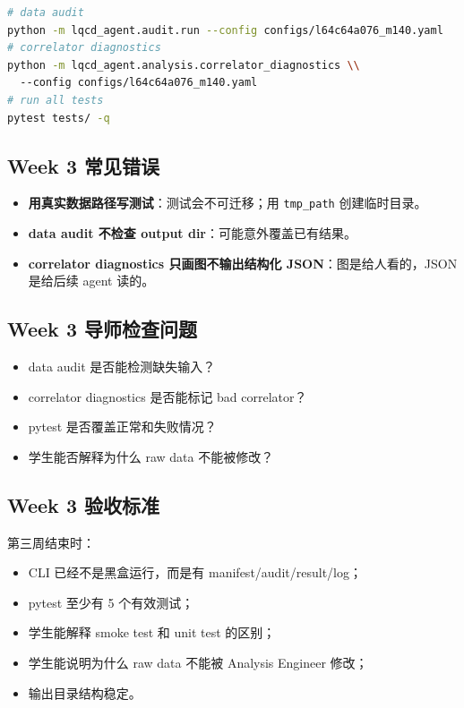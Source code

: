 \documentclass[11pt,a4paper,fontset=fandol]{ctexart}
\begin{document}
\begin{lstlisting}[language=bash]
# data audit
python -m lqcd_agent.audit.run --config configs/l64c64a076_m140.yaml
# correlator diagnostics
python -m lqcd_agent.analysis.correlator_diagnostics \\
  --config configs/l64c64a076_m140.yaml
# run all tests
pytest tests/ -q
\end{lstlisting}

\subsection{Week 3 常见错误}
\begin{itemize}[leftmargin=2em]
  \item \textbf{用真实数据路径写测试}：测试会不可迁移；用 \texttt{tmp\_path} 创建临时目录。
  \item \textbf{data audit 不检查 output dir}：可能意外覆盖已有结果。
  \item \textbf{correlator diagnostics 只画图不输出结构化 JSON}：图是给人看的，JSON 是给后续 agent 读的。
\end{itemize}

\subsection{Week 3 导师检查问题}
\begin{itemize}[leftmargin=2em]
  \item data audit 是否能检测缺失输入？
  \item correlator diagnostics 是否能标记 bad correlator？
  \item pytest 是否覆盖正常和失败情况？
  \item 学生能否解释为什么 raw data 不能被修改？
\end{itemize}

\subsection{Week 3 验收标准}

第三周结束时：

\begin{itemize}[leftmargin=2em]
  \item CLI 已经不是黑盒运行，而是有 manifest/audit/result/log；
  \item pytest 至少有 5 个有效测试；
  \item 学生能解释 smoke test 和 unit test 的区别；
  \item 学生能说明为什么 raw data 不能被 Analysis Engineer 修改；
  \item 输出目录结构稳定。
\end{itemize}
\end{document}
